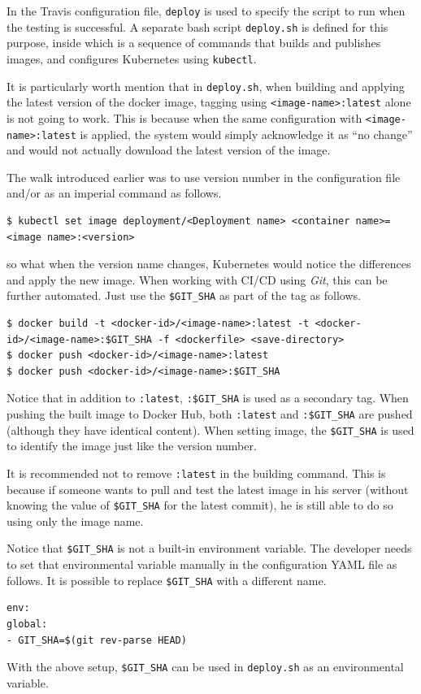 In the Travis configuration file, \verb|deploy| is used to specify the script to run when the testing is successful. A separate bash script \verb|deploy.sh| is defined for this purpose, inside which is a sequence of commands that builds and publishes images, and configures Kubernetes using \verb|kubectl|.

It is particularly worth mention that in \verb|deploy.sh|, when building and applying the latest version of the docker image, tagging using \verb|<image-name>:latest| alone is not going to work. This is because when the same configuration with \verb|<image-name>:latest| is applied, the system would simply acknowledge it as ``no change'' and would not actually download the latest version of the image.

The walk introduced earlier was to use version number in the configuration file and/or as an imperial command as follows.
\begin{lstlisting}
$ kubectl set image deployment/<Deployment name> <container name>=<image name>:<version>
\end{lstlisting}
so what when the version name changes, Kubernetes would notice the differences and apply the new image. When working with CI/CD using \textit{Git}, this can be further automated. Just use the \verb|$GIT_SHA| as part of the tag as follows.
\begin{lstlisting}
$ docker build -t <docker-id>/<image-name>:latest -t <docker-id>/<image-name>:$GIT_SHA -f <dockerfile> <save-directory>
$ docker push <docker-id>/<image-name>:latest
$ docker push <docker-id>/<image-name>:$GIT_SHA
\end{lstlisting}
Notice that in addition to \verb|:latest|, \verb|:$GIT_SHA| is used as a secondary tag. When pushing the built image to Docker Hub, both \verb|:latest| and \verb|:$GIT_SHA| are pushed (although they have identical content). When setting image, the \verb|$GIT_SHA| is used to identify the image just like the version number.

It is recommended not to remove \verb|:latest| in the building command. This is because if someone wants to pull and test the latest image in his server (without knowing the value of \verb|$GIT_SHA| for the latest commit), he is still able to do so using only the image name.

Notice that \verb|$GIT_SHA| is not a built-in environment variable. The developer needs to set that environmental variable manually in the configuration YAML file as follows. It is possible to replace \verb|$GIT_SHA| with a different name.
\begin{lstlisting}
env:
global:
- GIT_SHA=$(git rev-parse HEAD)
\end{lstlisting}
With the above setup, \verb|$GIT_SHA| can be used in \verb|deploy.sh| as an environmental variable.

